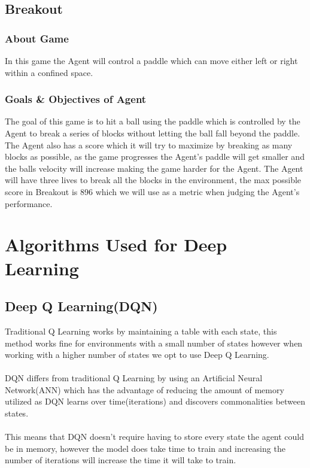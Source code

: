 \documentclass[conference]{IEEEtran}
\begin{document}
\subsection{Breakout}
\subsubsection{About Game}
In this game the Agent will control a paddle which can move either left or right within a confined space.
\subsubsection{Goals \& Objectives of Agent}
The goal of this game is to hit a ball using the paddle which is controlled by the Agent to break a series of blocks without letting the ball fall beyond the paddle.  The Agent also has a score which it will try to maximize by breaking as many blocks as possible, as the game progresses the Agent's paddle will get smaller and the balls velocity will increase making the game harder for the Agent.  The Agent will have three lives to break all the blocks in the environment, the max possible score in Breakout is 896 which we will use as a metric when judging the Agent's performance.
\section{Algorithms Used for Deep Learning}
\subsection{Deep Q Learning(DQN)}
Traditional Q Learning works by maintaining a table with each state, this method works fine for environments with a small number of states however when working with a higher number of states we opt to use Deep Q Learning. 
\\
\\
DQN differs from traditional Q Learning by using an Artificial Neural Network(ANN) which has the advantage of reducing the amount of memory utilized as DQN learns over time(iterations) and discovers commonalities between states.  
\\
\\
This means that DQN doesn't require having to store every state the agent could be in memory, however the model does take time to train and increasing the number of iterations will increase the time it will take to train.
\end{document}
